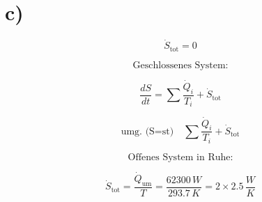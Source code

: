

\section*{c)}

\[
\dot{S}_{\text{tot}} = 0
\]

\[
\text{Geschlossenes System:}
\]

\[
\frac{dS}{dt} = \sum \frac{\dot{Q}_i}{T_i} + \dot{S}_{\text{tot}}
\]

\[
\text{umg. (S=st)} \quad \sum \frac{\dot{Q}_i}{T_i} + \dot{S}_{\text{tot}}
\]

\[
\text{Offenes System in Ruhe:}
\]

\[
\dot{S}_{\text{tot}} = \frac{\dot{Q}_{\text{um}}}{T} = \frac{62300 \, W}{293.7 \, K} = 2 \times 2.5 \, \frac{W}{K}
\]